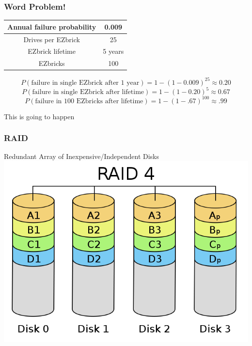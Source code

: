 \documentclass{beamer}
\theoremstyle{mystyle}
\begin{document}
\begin{frame}
\frametitle{Word Problem!}

\begin{center}
	\begin{tabular}{ | c | c | }
		\hline Annual failure probability & 0.009 \\
		\hline Drives per EZbrick & 25 \\
		\hline EZbrick lifetime & 5 years \\
		\hline EZbricks & 100 \\
		\hline 	
	\end{tabular}
\end{center}

\pause
\[ P(\text{failure in single EZbrick after 1 year} ) = 1 - (1 - 0.009)^{25} \approx 0.20\]
\pause
\[P(\text{failure in single EZbrick after lifetime} ) = 1 - (1 - 0.20)^5 \approx 0.67\]
\pause
\[P(\text{failure in 100 EZbricks after lifetime} ) = 1 - (1 -.67)^{100} \approx .99 \]
\pause
\begin{center}
This is going to happen
\end{center}
\end{frame}

\begin{frame}
\frametitle{RAID}

	\begin{center}
		Redundant Array of Inexpensive/Independent Disks
		\includegraphics[width=0.5\linewidth]{raid4}	
	\end{center}
\end{frame}

\end{document}
